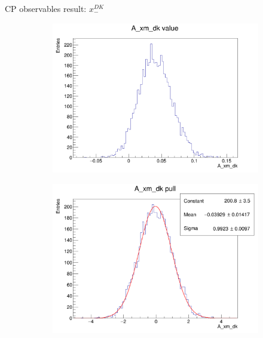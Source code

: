 \documentclass{beamer}
\begin{document}
\begin{frame}{CP observables result: $x_-^{DK}$}
  \begin{figure}
    \centering
    \begin{subfigure}{0.42\textwidth}
      \includegraphics[width = 1.0\textwidth]{Plots/A_xm_dk_value.png}
    \end{subfigure}
    \begin{subfigure}{0.42\textwidth}
      \includegraphics[width = 1.0\textwidth]{Plots/A_xm_dk_pull.png}
    \end{subfigure}%
    \begin{subfigure}{0.42\textwidth}

\end{subfigure}
\end{figure}
\end{frame}
\end{document}
